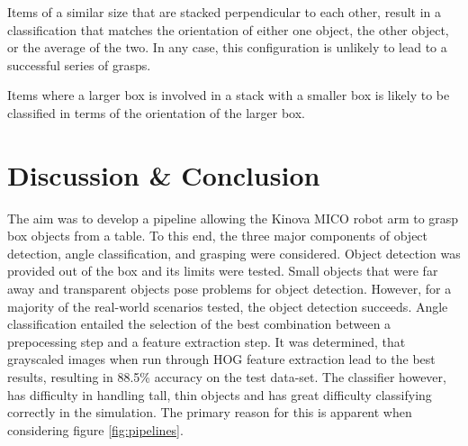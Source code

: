 \documentclass[letterpaper, 10 pt, conference]{conf/ieeeconf}  %
\begin{document}
Items of a similar size that are stacked perpendicular to each other, result in
a classification that matches the orientation of either one object, the other
object, or the average of the two. In any case, this configuration is unlikely
to lead to a successful series of grasps.

Items where a larger box is involved in a stack with a smaller box is likely to
be classified in terms of the orientation of the larger box.

\section{Discussion \& Conclusion}
\label{sec:discussion}
The aim was to develop a pipeline allowing the Kinova MICO robot arm to grasp
box objects from a table. To this end, the three major components of object
detection, angle classification, and grasping were considered. Object detection
was provided out of the box and its limits were tested. Small objects that were
far away and transparent objects pose problems for object detection. However,
for a majority of the real-world scenarios tested, the object detection
succeeds. Angle classification entailed the selection of the best combination
between a prepocessing step and a feature extraction step. It was determined,
that grayscaled images when run through HOG feature extraction lead to the best
results, resulting in 88.5\% accuracy on the test data-set. The classifier
however, has difficulty in handling tall, thin objects and has great difficulty
classifying correctly in the simulation. The primary reason for this is apparent
when considering figure \ref{fig:pipelines}.
\end{document}
